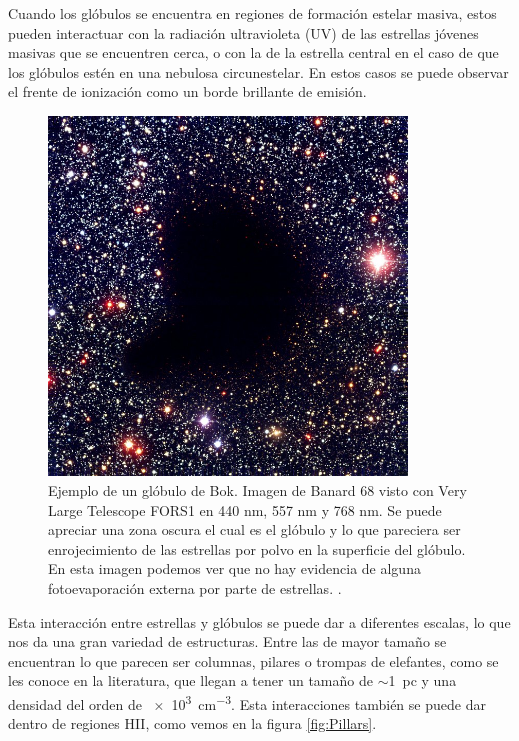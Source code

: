 \documentclass{book}
\begin{document}
Cuando los glóbulos se encuentra en regiones de formación estelar masiva, estos pueden interactuar con la radiación ultravioleta (UV) de las estrellas jóvenes masivas que se encuentren cerca, o con la de la estrella central en el caso de que los glóbulos estén en una nebulosa circunestelar. En estos casos se puede observar el frente de ionización como un borde brillante de emisión.

\begin{figure}[htb]
    \centering
    \includegraphics[width=0.85\textwidth]{images Chapter 1/C1_Bok_globule.jpg}
    \caption{Ejemplo de un glóbulo de Bok. Imagen de Banard 68 visto con Very Large Telescope FORS1 en 440 nm, 557 nm y 768 nm. Se puede apreciar una zona oscura el cual es el glóbulo y lo que pareciera ser enrojecimiento de las estrellas por polvo en la superficie del glóbulo. En esta imagen podemos ver que no hay evidencia de alguna fotoevaporación externa por parte de estrellas. \citep{Alves:2001}.}
    \label{fig:Banard}
\end{figure}

Esta interacción entre estrellas y glóbulos se puede dar a diferentes escalas, lo que nos da una gran variedad de estructuras. Entre las de mayor tamaño se encuentran lo que parecen ser columnas, pilares o trompas de elefantes, como se les conoce en la literatura, que llegan a tener un tamaño de $\sim$\SI{1}{pc} y una densidad del orden de \SI{e3}{cm^{-3}}. Esta interacciones también se puede dar dentro de regiones HII, como vemos en la figura \ref{fig:Pillars}.
\end{document}
